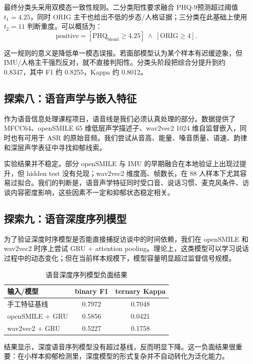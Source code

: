 \documentclass[UTF8,zihao=-4,fontset=windows]{ctexart}
\newcommand{\phq}{PHQ-9}
\begin{document}
最终分类头采用双模态一致性规则。二分类阳性要求融合 \phq 预测超过阈值 $t_1=4.25$，同时 ORIG 主干也给出不低的步态/人格证据；三分类在此基础上使用 $t_2=11$ 判断重度。可以概括为：
\[
\text{positive} = [\mathrm{PHQ}_{\mathrm{blend}}\geq 4.25]\ \land\ [\mathrm{ORIG}\geq 4].
\]

这一规则的意义是降低单一模态误报。若面部模型认为某个样本有迟缓迹象，但 IMU/人格主干强烈反对，就不直接判阳性。分类头阶段把综合分提升到约 0.8347，其中 F1 约 0.8255，Kappa 约 0.8012。

\subsection{探索八：语音声学与嵌入特征}

作为语音信息处理课程项目，语音线是我们必须认真处理的部分。数据提供了 MFCC64、openSMILE 65 维低层声学描述子、wav2vec2 1024 维自监督嵌入，同时也有可用于 ASR 的原始音频。我们尝试从音高、能量、嗓音质量、语速、韵律和深层声学表征中寻找抑郁线索。

实验结果并不稳定。部分 openSMILE 与 IMU 的早期融合在本地验证上出现过提升，但 hidden test 没有兑现；wav2vec2 维度高、帧数长，在 88 人样本下尤其容易过拟合。我们的判断是，语音声学特征同时受口音、说话习惯、麦克风条件、访谈内容密度影响，这些因素不一定和抑郁状态稳定相关。

\subsection{探索九：语音深度序列模型}

为了验证深度时序模型是否能直接捕捉访谈中的时间依赖，我们在 openSMILE 和 wav2vec2 时序上尝试 GRU + attention pooling。理论上，这类模型可以学习说话过程中的动态变化；但在当前样本规模下，模型容量明显超过监督信号规模。

\begin{table}[H]
  \centering
  \caption{语音深度序列模型负面结果}
  \begin{tabular}{lcc}
    \toprule
    输入/模型 & binary F1 & ternary Kappa \\
    \midrule
    手工特征基线 & 0.7972 & 0.7048 \\
    openSMILE + GRU & 0.5856 & 0.0421 \\
    wav2vec2 + GRU & 0.5227 & 0.1758 \\
    \bottomrule
  \end{tabular}
\end{table}

结果显示，深度语音序列模型没有超过基线，反而明显下降。这一负面结果很重要：在小样本抑郁检测里，深度模型的形式复杂并不自动转化为泛化能力。
\end{document}
